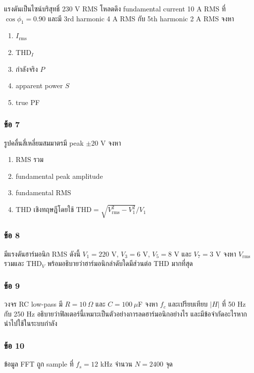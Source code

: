 แรงดันเป็นไซน์บริสุทธิ์ 230 V RMS โหลดดึง fundamental current 10 A RMS ที่ $\cos\phi_1=0.90$ และมี 3rd harmonic 4 A RMS กับ 5th harmonic 2 A RMS จงหา

\begin{enumerate}
    \item $I_{\mathrm{rms}}$
    \item THD$_I$
    \item กำลังจริง $P$
    \item apparent power $S$
    \item true PF
\end{enumerate}

\subsubsection{ข้อ 7}

รูปคลื่นสี่เหลี่ยมสมมาตรมี peak $\pm20$ V จงหา

\begin{enumerate}
    \item RMS รวม
    \item fundamental peak amplitude
    \item fundamental RMS
    \item THD เชิงทฤษฎีโดยใช้ $\mathrm{THD}=\sqrt{V_{\mathrm{rms}}^2-V_1^2}/V_1$
\end{enumerate}

\subsubsection{ข้อ 8}

มีแรงดันฮาร์มอนิก RMS ดังนี้ $V_1=220$ V, $V_3=6$ V, $V_5=8$ V และ $V_7=3$ V จงหา $V_{\mathrm{rms}}$ รวมและ THD$_V$ พร้อมอธิบายว่าฮาร์มอนิกลำดับใดมีส่วนต่อ THD มากที่สุด

\subsubsection{ข้อ 9}

วงจร RC low-pass มี $R=10\ \Omega$ และ $C=100\ \mu$F จงหา $f_c$ และเปรียบเทียบ $|H|$ ที่ 50 Hz กับ 250 Hz อธิบายว่าฟิลเตอร์นี้เหมาะเป็นตัวอย่างการลดฮาร์มอนิกอย่างไร และมีข้อจำกัดอะไรหากนำไปใช้ในระบบกำลัง

\subsubsection{ข้อ 10}

ข้อมูล FFT ถูก sample ที่ $f_s=12$ kHz จำนวน $N=2400$ จุด

